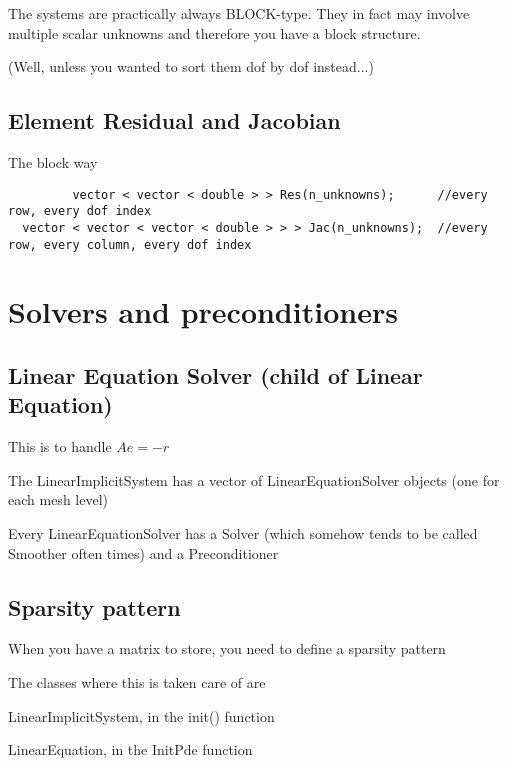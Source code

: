 \documentclass[10pt]{book}
\begin{document}
   
     The systems are practically always BLOCK-type. 
     They in fact may involve multiple scalar unknowns and therefore you have a block structure.
     
     (Well, unless you wanted to sort them dof by dof instead...)
     
     
    \subsection{Element Residual and Jacobian}
     
     The block way
     
      \begin{verbatim}
         vector < vector < double > > Res(n_unknowns);      //every row, every dof index
  vector < vector < vector < double > > > Jac(n_unknowns);  //every row, every column, every dof index

      \end{verbatim}

     
     
     
      
      
\section{Solvers and preconditioners}



 \subsection{Linear Equation Solver (child of Linear Equation)}
 
 This is to handle $ A e = - r $
 
 The LinearImplicitSystem has a vector of LinearEquationSolver objects (one for each mesh level)
 
 Every LinearEquationSolver has a Solver (which somehow tends to be called Smoother often times) and a Preconditioner
 
 \subsection{Sparsity pattern}
 
  When you have a matrix to store, you need to define a sparsity pattern
  
  The classes where this is taken care of are 
  
  LinearImplicitSystem, in the init() function
  
  LinearEquation, in the InitPde function
  
\end{document}
